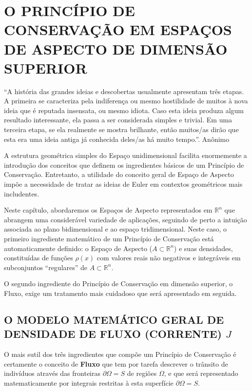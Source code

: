 \section{O PRINCÍPIO DE CONSERVAÇÃO EM ESPAÇOS DE ASPECTO DE DIMENSÃO SUPERIOR}

\begin{citacao}
``A história das grandes ideias e descobertas usualmente apresentam três etapas. A primeira se caracteriza pela indiferença ou mesmo hostilidade de muitos à nova ideia que é reputada insensata, ou mesmo idiota. Caso esta ideia produza algum resultado interessante, ela passa a ser considerada simples e trivial. Em uma terceira etapa, se ela realmente se mostra brilhante, então muitos/as dirão que esta era uma ideia antiga já conhecida deles/as há muito tempo.''. Anônimo
\end{citacao}


A estrutura geométrica simples do Espaço unidimensional facilita enormemente a introdução dos conceitos que definem os ingredientes básicos de um Princípio de Conservação. Entretanto, a utilidade do conceito geral de Espaço de Aspecto impõe a necessidade de tratar as ideias de Euler em contextos geométricos mais includentes.

Neste capítulo, abordaremos os Espaços de Aspecto representados em \(\mathbb{R}^n\) que abrangem uma considerável variedade de aplicações, seguindo de perto a intuição associada ao plano bidimensional e ao espaço tridimensional. Neste caso, o primeiro ingrediente matemático de um Princípio de Conservação está automaticamente definido: o Espaço de Aspecto (\(A \subset \mathbb{R}^n\)) e suas densidades, constituídas de funções \(\rho(x)\) com valores reais não negativos e integráveis em subconjuntos ``regulares'' de \(A \subset \mathbb{R}^n\).

O segundo ingrediente do Princípio de Conservação em dimensão superior, o Fluxo, exige um tratamento mais cuidadoso que será apresentado em seguida.

\subsection{O MODELO MATEMÁTICO GERAL DE DENSIDADE DE FLUXO (CORRENTE) \(J\)}

O mais sutil dos três ingredientes que compõe um Princípio de Conservação é certamente o conceito de \textbf{Fluxo} que tem por tarefa descrever o trânsito de indivíduos através das fronteiras \(\partial \Omega = S\) de regiões \(\Omega\), e que será representado matematicamente por integrais restritas à esta superfície \(\partial \Omega = S\).

